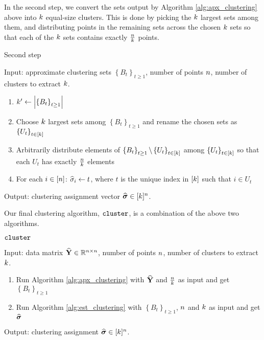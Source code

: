 In the second step, we convert the sets output by Algorithm \ref{alg:apx_clustering}
above into $k$ equal-size clusters. This is done by picking
the $k$ largest sets among them, and distributing points
in the remaining sets across the chosen $k$ sets so that
each of the $k$ sets contains exactly $\frac{n}{k}$
points. 
\begin{algorithm}[H]
\caption{Second step \label{alg:est_clustering}}

Input: approximate clustering sets $\left\{ B_{t}\right\} _{t\ge1}$,
number of points $n$, number of clusters to extract $k$.
\begin{enumerate}
\item $k'\leftarrow\left|\left\{ B_{t}\right\} _{t\ge1}\right|$
\item Choose $k$ largest sets among $\left\{ B_{t}\right\} _{t\ge1}$
and rename the chosen sets as $\left\{ U_{t}\right\} _{t\in\left[k\right]}$
\item Arbitrarily distribute elements of $\left\{ B_{t}\right\} _{t\ge1}\backslash\left\{ U_{t}\right\} _{t\in\left[k\right]}$
among $\left\{ U_{t}\right\} _{t\in\left[k\right]}$ so that
each $U_{t}$ has exactly $\frac{n}{k}$ elements
\item For each $i\in\left[n\right]$: $\widehat{\sigma}_{i}\leftarrow t$, where
$t$ is the unique index in $[k]$ such that $i\in U_{t}$
\end{enumerate}
Output: clustering assignment vector $\widehat{\boldsymbol{\sigma}}\in[k]^{n}$.
\end{algorithm}
Our final clustering algorithm, $\texttt{cluster}$, is a combination of
the above two algorithms. 
\begin{algorithm}[H]
\caption{$\protect\texttt{cluster}$ \label{alg:clustering}}

Input: data matrix $\widehat{\mathbf{Y}}\in\mathbb{R}^{n\times n}$, number of points
$n$, number of clusters to extract $k$.
\begin{enumerate}
\item Run Algorithm \ref{alg:apx_clustering} with $\widehat{\mathbf{Y}}$ and $\frac{n}{k}$
as input and get $\left\{ B_{t}\right\} _{t\ge1}$
\item Run Algorithm \ref{alg:est_clustering} with $\left\{ B_{t}\right\} _{t\ge1}$,
$n$ and $k$ as input and get $\widehat{\boldsymbol{\sigma}}$
\end{enumerate}
Output: clustering assignment $\widehat{\boldsymbol{\sigma}}\in[k]^{n}$.
\end{algorithm}

